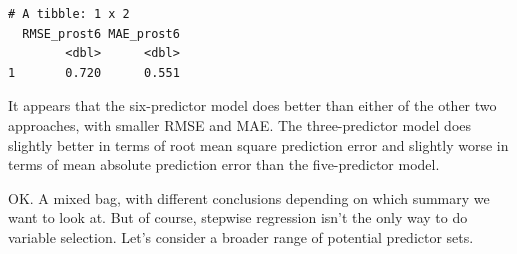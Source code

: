 \documentclass[]{book}
\newenvironment{Shaded}{\begin{snugshade}}{\end{snugshade}}
\newcommand{\KeywordTok}[1]{\textcolor[rgb]{0.13,0.29,0.53}{\textbf{#1}}}
\newcommand{\DataTypeTok}[1]{\textcolor[rgb]{0.13,0.29,0.53}{#1}}
\newcommand{\DecValTok}[1]{\textcolor[rgb]{0.00,0.00,0.81}{#1}}
\newcommand{\StringTok}[1]{\textcolor[rgb]{0.31,0.60,0.02}{#1}}
\newcommand{\OperatorTok}[1]{\textcolor[rgb]{0.81,0.36,0.00}{\textbf{#1}}}
\newcommand{\NormalTok}[1]{#1}
\theoremstyle{definition}
\theoremstyle{definition}
\theoremstyle{definition}
\theoremstyle{remark}
\begin{document}
\begin{Shaded}
\end{Shaded}

\begin{verbatim}
# A tibble: 1 x 2
  RMSE_prost6 MAE_prost6
        <dbl>      <dbl>
1       0.720      0.551
\end{verbatim}

It appears that the six-predictor model does better than either of the
other two approaches, with smaller RMSE and MAE. The three-predictor
model does slightly better in terms of root mean square prediction error
and slightly worse in terms of mean absolute prediction error than the
five-predictor model.

OK. A mixed bag, with different conclusions depending on which summary
we want to look at. But of course, stepwise regression isn't the only
way to do variable selection. Let's consider a broader range of
potential predictor sets.
\end{document}
